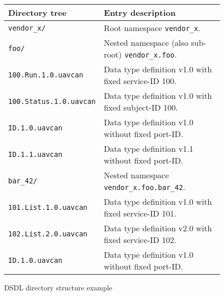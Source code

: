 \begin{remark}
    \begin{figure}[H]
        \begin{tabu}{|l|X|} \hline
            \rowfont{\bfseries}
            Directory tree & Entry description \\\hline

            \texttt{vendor\_x/} &
            Root namespace \texttt{vendor\_x}. \\

            \texttt{\qquad{}foo/} &
            Nested namespace (also sub-root) \texttt{vendor\_x.foo}. \\

            \texttt{\qquad{}\qquad{}100.Run.1.0.uavcan} &
            Data type definition v1.0 with fixed service-ID 100. \\

            \texttt{\qquad{}\qquad{}100.Status.1.0.uavcan} &
            Data type definition v1.0 with fixed subject-ID 100. \\

            \texttt{\qquad{}\qquad{}ID.1.0.uavcan} &
            Data type definition v1.0 without fixed port-ID. \\

            \texttt{\qquad{}\qquad{}ID.1.1.uavcan} &
            Data type definition v1.1 without fixed port-ID. \\

            \texttt{\qquad{}\qquad{}bar\_42/} &
            Nested namespace \texttt{vendor\_x.foo.bar\_42}. \\

            \texttt{\qquad{}\qquad{}\qquad{}101.List.1.0.uavcan} &
            Data type definition v1.0 with fixed service-ID 101. \\

            \texttt{\qquad{}\qquad{}\qquad{}102.List.2.0.uavcan} &
            Data type definition v2.0 with fixed service-ID 102. \\

            \texttt{\qquad{}\qquad{}\qquad{}ID.1.0.uavcan} &
            Data type definition v1.0 without fixed port-ID. \\\hline
        \end{tabu}
        \caption{DSDL directory structure example}\label{fig:dsdl_directory_structure_example}
    \end{figure}
\end{remark}

